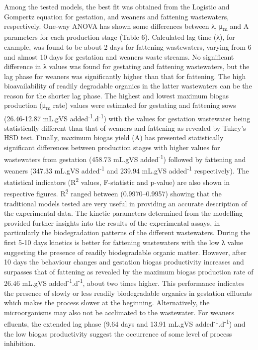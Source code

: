 Among the tested models, the best fit was obtained from the Logistic and Gompertz equation for gestation, and weaners and fattening wastewaters, respectively. One-way ANOVA has shown some differences between λ, μ\textsubscript{m} and A  parameters for each production stage (Table 6). Calculated lag time (λ), for example, was found to be about 2 days for fattening wastewaters, varying from 6 and almost 10 days for gestation and weaners waste streams. No significant difference in λ values was found for gestating and fattening wastewaters, but the lag phase for weaners was significantly higher than that for fattening. The high bioavailability of readily degradable organics in the latter wastewaters can be the reason for the shorter lag phase. The highest and lowest maximum biogas production (μ\textsubscript{m} rate) values were estimated for gestating and fattening sows (26.46-12.87 mL.gVS added\textsuperscript{-1}.d\textsuperscript{-1}) with the values for gestation wastewater being statistically different than that of weaners and fattening as revealed by Tukey’s HSD test. Finally, maximum biogas yield (A) has presented statistically significant differences between production stages with higher values for wastewaters from gestation (458.73 mL.gVS added\textsuperscript{-1}) followed by fattening and weaners (347.33 mL.gVS added\textsuperscript{-1} and 239.94 mL.gVS added\textsuperscript{-1} respectively). The statistical indicators (R\textsuperscript{2} values, F-statistic and p-value) are also shown in respective figures. R\textsuperscript{2} ranged between (0.9970–0.9957) showing that the traditional models tested are very useful in providing an accurate description of the experimental data. The kinetic parameters determined from the modelling provided further insights into the results of the experimental assays, in particularly the biodegradation patterns of the different wastewaters. During the first 5-10 days kinetics is better for fattening wastewaters with the low λ value suggesting the presence of readily biodegradable organic matter. However, after 10 days the behaviour changes and gestation biogas productivity increases and surpasses that of fattening as revealed by the maximum biogas production rate of 26.46 mL.gVS added\textsuperscript{-1}.d\textsuperscript{-1}, about two times higher. This performance indicates the presence of slowly or less readily  biodegradable organics in gestation effluents which makes the process slower at the beginning. Alternatively, the microorganisms may also not be acclimated to the wastewater. For weaners efluents, the extended lag phase (9.64 days and 13.91 mL.gVS added\textsuperscript{-1}.d\textsuperscript{-1}) and the low biogas productivity suggest the occurrence of some level of process inhibition.